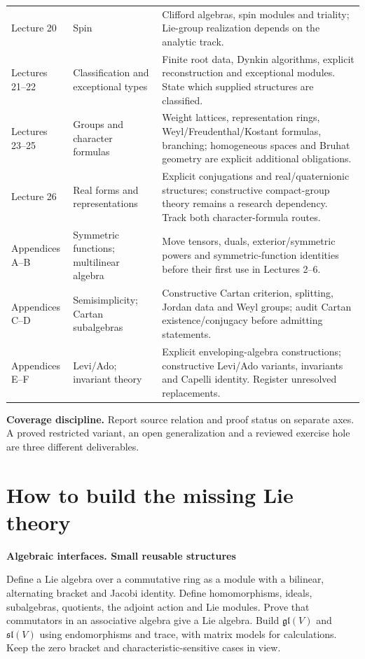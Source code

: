 \documentclass[11pt,a4paper]{article}
\newcommand{\slie}{\mathfrak{sl}}
\newcommand{\stage}[2]{\par\textbf{#1. #2}\par}
\begin{document}
{\begin{tabularx}{\linewidth}{@{}P{27mm}P{43mm}Y@{}}
Lecture 20 & Spin & Clifford algebras, spin modules and triality; Lie-group realization depends on the analytic track. \\
Lectures 21--22 & Classification and exceptional types & Finite root data, Dynkin algorithms, explicit reconstruction and exceptional modules. State which supplied structures are classified. \\
Lectures 23--25 & Groups and character formulas & Weight lattices, representation rings, Weyl/Freudenthal/Kostant formulas, branching; homogeneous spaces and Bruhat geometry are explicit additional obligations. \\
Lecture 26 & Real forms and representations & Explicit conjugations and real/quaternionic structures; constructive compact-group theory remains a research dependency. Track both character-formula routes. \\
Appendices A--B & Symmetric functions; multilinear algebra & Move tensors, duals, exterior/symmetric powers and symmetric-function identities before their first use in Lectures 2--6. \\
Appendices C--D & Semisimplicity; Cartan subalgebras & Constructive Cartan criterion, splitting, Jordan data and Weyl groups; audit Cartan existence/conjugacy before admitting statements. \\
Appendices E--F & Levi/Ado; invariant theory & Explicit enveloping-algebra constructions; constructive Levi/Ado variants, invariants and Capelli identity. Register unresolved replacements. \\
\bottomrule
\end{tabularx}}

\textbf{Coverage discipline.} Report source relation and proof status on
separate axes. A proved restricted variant, an open generalization and a
reviewed exercise hole are three different deliverables.

\newpage
\section{How to build the missing Lie theory}
\stage{Algebraic interfaces}{Small reusable structures}
Define a Lie algebra over a commutative ring as a module with a bilinear,
alternating bracket and Jacobi identity. Define homomorphisms, ideals,
subalgebras, quotients, the adjoint action and Lie modules. Prove that
commutators in an associative algebra give a Lie algebra. Build $\mathfrak{gl}(V)$
and $\slie(V)$ using endomorphisms and trace, with matrix models for calculations.
Keep the zero bracket and characteristic-sensitive cases in view.
\end{document}
